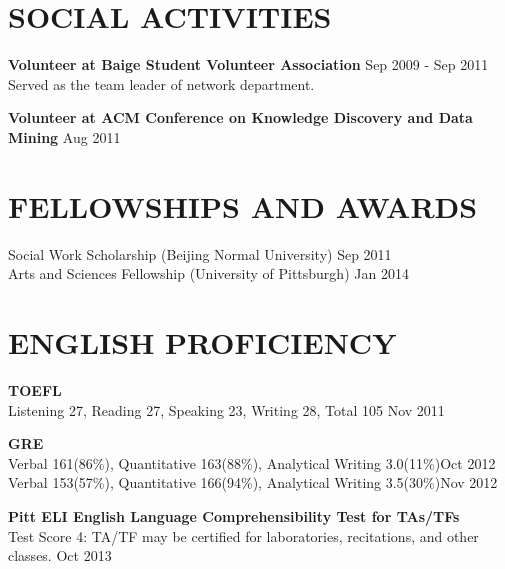 \begin{resume}
%
%




\section{\textsc{SOCIAL ACTIVITIES}}

\textbf{Volunteer at Baige Student Volunteer Association} \hfill Sep 2009 - Sep 2011\\
   Served as the team leader of network department.

\textbf{Volunteer at ACM Conference on Knowledge Discovery and Data Mining} \hfill Aug 2011






\section{\textsc{FELLOWSHIPS AND AWARDS}}
Social Work Scholarship (Beijing Normal University)  \hfill Sep 2011\\
Arts and Sciences Fellowship (University of Pittsburgh) \hfill Jan 2014




\section{\textsc{ENGLISH PROFICIENCY}}
\textbf{TOEFL}\\
Listening 27, Reading 27, Speaking 23, Writing 28, Total 105 \hfill Nov 2011

\textbf{GRE}\\
Verbal 161(86\%), Quantitative 163(88\%), Analytical Writing 3.0(11\%)\hfill Oct 2012\\
Verbal 153(57\%), Quantitative 166(94\%), Analytical Writing 3.5(30\%)\hfill Nov 2012

\textbf{Pitt ELI English Language Comprehensibility Test for TAs/TFs}\\
Test Score 4: TA/TF may be certified for laboratories, recitations, and other classes. \hfill Oct 2013




\end{resume}

